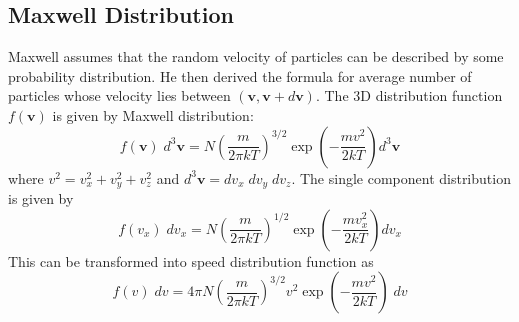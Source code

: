 \documentclass[../../../Main.tex]{subfiles}
\begin{document}
\subsection*{Maxwell Distribution} 
Maxwell assumes that the random velocity of particles can be described by some probability distribution. He then derived the formula for average number of particles whose velocity lies between $(\mathbf{v},\mathbf{v}+d\mathbf{v})$. The 3D distribution function $f(\mathbf{v})$ is given by Maxwell distribution:
\begin{equation*}
    f(\mathbf{v})\;d^3\mathbf{v}=N\left(\frac{m}{2\pi k T}\right)^{3/2}\exp\left(-\frac{m v^2}{2k T}\right)d^3\mathbf{v}
\end{equation*} 
where $v^2=v_x^2+v_y^2+v_z^2$ and $d^3\mathbf{v}=dv_x\; dv_y\; dv_z$. The single component distribution is given by 
\begin{equation*}
    f(v_x)\;dv_x=N\left(\frac{m}{2\pi k T}\right)^{1/2}\exp\left(-\frac{m v_x^2}{2k T}\right)dv_x
\end{equation*} This can be transformed into speed distribution function as 
\begin{equation*}
    f(v)\;dv=4\pi N\left(\frac{m}{2\pi k T}\right)^{3/2}v^2\exp\left(-\frac{m v^2}{2k T}\right)\;dv
\end{equation*}
\end{document}
